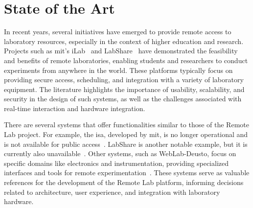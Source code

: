 %
%
\chapter{State of the Art} \label{cap:state-of-the-art}

In recent years, several initiatives have emerged to provide remote access to laboratory resources, especially in the context of higher education and research. Projects such as \acs{mit}'s iLab~\cite{ilab} and LabShare~\cite{labshare} have demonstrated the feasibility and benefits of remote laboratories, enabling students and researchers to conduct experiments from anywhere in the world. These platforms typically focus on providing secure access, scheduling, and integration with a variety of laboratory equipment. The literature highlights the importance of usability, scalability, and security in the design of such systems, as well as the challenges associated with real-time interaction and hardware integration.

There are several systems that offer functionalities similar to those of the Remote Lab project. For example, the \acs{isa}, developed by \acs{mit}, is no longer operational and is not available for public access~\cite{ilab}. LabShare is another notable example, but it is currently also unavailable~\cite{labshare}. Other systems, such as WebLab-Deusto, focus on specific domains like electronics and instrumentation, providing specialized interfaces and tools for remote experimentation~\cite{weblabdeusto}. These systems serve as valuable references for the development of the Remote Lab platform, informing decisions related to architecture, user experience, and integration with laboratory hardware.
